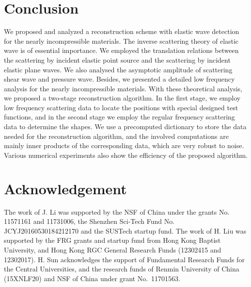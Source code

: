 \documentclass[a4paper,11pt]{article}
\theoremstyle{remark}
\theoremstyle{definition}
\numberwithin{equation}{section}
\begin{document}
\section{Conclusion}\label{sect:conclusion}
We proposed and analyzed a reconstruction scheme with elastic wave detection for the nearly incompressible materials. The inverse scattering theory of elastic wave is of essential importance.  We employed the translation relations between the scattering by incident elastic point source and the scattering by incident elastic plane waves. We also analysed the asymptotic amplitude of scattering shear wave and pressure wave. Besides, we presented a detailed low frequency analysis for the nearly incompressible materials. With these theoretical analysis, we proposed a two-stage reconstruction algorithm. In the first stage, we employ low frequency scattering data to locate the positions with special designed test functions, and in the second stage we employ the regular frequency scattering data to determine the shapes. We use a precomputed dictionary to store the data needed for the reconstruction algorithm, and the involved computations are mainly inner products of the corresponding data, which are very robust to noise. Various numerical experiments also show the efficiency of the proposed algorithm.

\section*{Acknowledgement}
{\small
The work of J. Li was supported by the NSF of China under the grants No.\, 11571161 and 11731006, the Shenzhen Sci-Tech Fund No. JCYJ20160530184212170 and the SUSTech startup fund.
The work of H. Liu was supported by the FRG grants and startup fund from Hong Kong Baptist University, and Hong Kong RGC General Research Funds (12302415 and 12302017).
H. Sun acknowledges the support of
Fundamental Research Funds for the Central Universities, and the
research funds of Renmin University of China (15XNLF20) and NSF of China under grant No. \,11701563.
}
\end{document}
